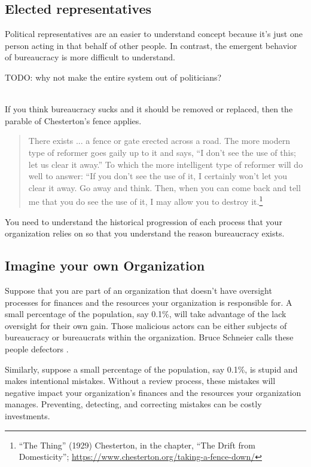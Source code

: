 \subsection{Elected representatives}
Political representatives are an easier to understand concept because it's just one person acting in that behalf of other people.
In contrast, the emergent behavior of bureaucracy is more difficult to understand. 

TODO: why not make the entire system out of politicians?


\ \\

If you think bureaucracy sucks and it should be removed or replaced, then the parable of Chesterton's fence applies. 
\begin{quote}
There exists ... a fence or gate erected across a road. The more modern type of reformer goes gaily up to it and says, “I don’t see the use of this; let us clear it away.” To which the more intelligent type of reformer will do well to answer: “If you don’t see the use of it, I certainly won’t let you clear it away. Go away and think. Then, when you can come back and tell me that you do see the use of it, I may allow you to destroy it.\footnote{``The Thing'' (1929) Chesterton, in the chapter, ``The Drift from Domesticity''; \href{https://www.chesterton.org/taking-a-fence-down/}{https://www.chesterton.org/taking-a-fence-down/}}
\end{quote}
You need to understand the historical progression of each process that your organization relies on so that you understand the reason bureaucracy exists.


\subsection{Imagine your own Organization}

Suppose that you are part of an organization that doesn't have oversight processes for finances and the resources your organization is responsible for. A small percentage of the population, say 0.1\%, will take advantage of the lack oversight for their own gain. Those malicious actors can be either subjects of bureaucracy or bureaucrats within the organization. Bruce Schneier  calls these people defectors \cite{2012_Schneier}.

Similarly, suppose a small percentage of the population, say 0.1\%, is stupid and makes intentional mistakes. Without a review process, these mistakes will negative impact your organization's finances and the resources your organization manages. Preventing, detecting, and correcting mistakes can be costly investments. 

